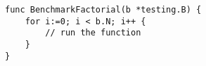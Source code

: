 \begin{lstlisting}[caption=Go Benchmark,label=lst:go_bench,float,floatplacement=H]
func BenchmarkFactorial(b *testing.B) {
    for i:=0; i < b.N; i++ {
        // run the function
    }
}
\end{lstlisting}